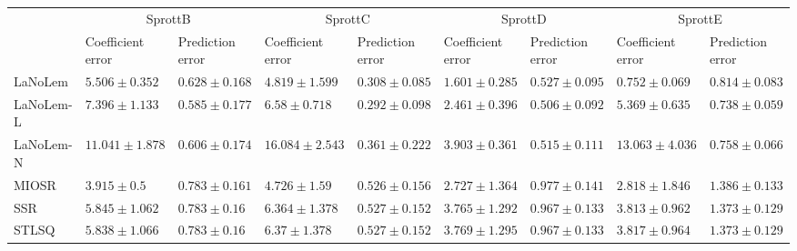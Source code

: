 \begin{table*}
{\begin{tabular}{lllllllll}
 & \multicolumn{2}{c}{SprottB} & \multicolumn{2}{c}{SprottC} & \multicolumn{2}{c}{SprottD} & \multicolumn{2}{c}{SprottE} \\
 & Coefficient error & Prediction error & Coefficient error & Prediction error & Coefficient error & Prediction error & Coefficient error & Prediction error \\
\midrule
LaNoLem & $5.506\pm 0.352$ & $0.628\pm 0.168$ & $4.819\pm 1.599$ & $0.308\pm 0.085$ & $\mathbf{1.601}\pm 0.285$ & $0.527\pm 0.095$ & $\mathbf{0.752}\pm 0.069$ & $0.814\pm 0.083$ \\
LaNoLem-L & $7.396\pm 1.133$ & $\mathbf{0.585}\pm 0.177$ & $6.58\pm 0.718$ & $\mathbf{0.292}\pm 0.098$ & $2.461\pm 0.396$ & $\mathbf{0.506}\pm 0.092$ & $5.369\pm 0.635$ & $\mathbf{0.738}\pm 0.059$ \\
LaNoLem-N & $11.041\pm 1.878$ & $0.606\pm 0.174$ & $16.084\pm 2.543$ & $0.361\pm 0.222$ & $3.903\pm 0.361$ & $0.515\pm 0.111$ & $13.063\pm 4.036$ & $0.758\pm 0.066$ \\
MIOSR & $\mathbf{3.915}\pm 0.5$ & $0.783\pm 0.161$ & $\mathbf{4.726}\pm 1.59$ & $0.526\pm 0.156$ & $2.727\pm 1.364$ & $0.977\pm 0.141$ & $2.818\pm 1.846$ & $1.386\pm 0.133$ \\
SSR & $5.845\pm 1.062$ & $0.783\pm 0.16$ & $6.364\pm 1.378$ & $0.527\pm 0.152$ & $3.765\pm 1.292$ & $0.967\pm 0.133$ & $3.813\pm 0.962$ & $1.373\pm 0.129$ \\
STLSQ & $5.838\pm 1.066$ & $0.783\pm 0.16$ & $6.37\pm 1.378$ & $0.527\pm 0.152$ & $3.769\pm 1.295$ & $0.967\pm 0.133$ & $3.817\pm 0.964$ & $1.373\pm 0.129$ \\

\midrule


\end{tabular}}
\end{table*}
